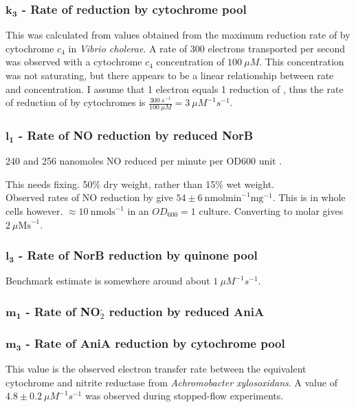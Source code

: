 \subsubsection*{$\mathbf{k_3}$ {\bf- Rate of \cbbthree{} reduction by cytochrome pool}}
This was calculated from values obtained from the maximum reduction rate of \cbbthree{} by cytochrome $c_4$ in \textit{Vibrio cholerae}\cite{Chang2010}. A rate of 300 electrons transported per second was observed with a cytochrome $c_4$ concentration of $100~\mu M$. This concentration was not saturating, but there appears to be a linear relationship between rate and concentration. I assume that 1 electron equals 1 reduction of \cbbthree{}, thus the rate of reduction of \cbbthree{} by cytochromes is $\frac{300~s^{-1}}{100~\mu M} = 3~\mu M^{-1} s^{-1}$.

\subsubsection*{$\mathbf{l_1}$ {\bf- Rate of NO reduction by reduced NorB}}
240 and 256 nanomoles NO reduced per minute per OD600 unit \citet{Barth2009}.

This needs fixing. 50\% dry weight, rather than 15\% wet weight.\\
Observed rates of NO reduction by \citet{Rock2007} give $54 \pm 6~\mathrm{nmol min}^{-1} \mathrm{mg}^{-1}$. This is in whole cells however.
$\approx 10~\mathrm{nmol s}^{-1}$ in an $OD_{600} = 1$ culture. Converting to molar gives $2~\mu\mathrm{M s}^{-1}$. 

\subsubsection*{$\mathbf{l_3}$ {\bf- Rate of NorB reduction by quinone pool}}
Benchmark estimate is somewhere around about $1~\mu M^{-1}s^{-1}$.

\subsubsection*{$\mathbf{m_1}$ {\bf- Rate of NO$_{\textrm{2}}^{\textrm{-}}$ reduction by reduced AniA}}


\subsubsection*{$\mathbf{m_3}$ {\bf- Rate of AniA reduction by cytochrome pool}}
This value is the observed electron transfer rate between the equivalent cytochrome and nitrite reductase from \textit{Achromobacter xylosoxidans}. A value of $4.8\pm0.2~\mu M^{-1}s^{-1}$ was observed during stopped-flow experiments\cite{Nojiri2009}.


